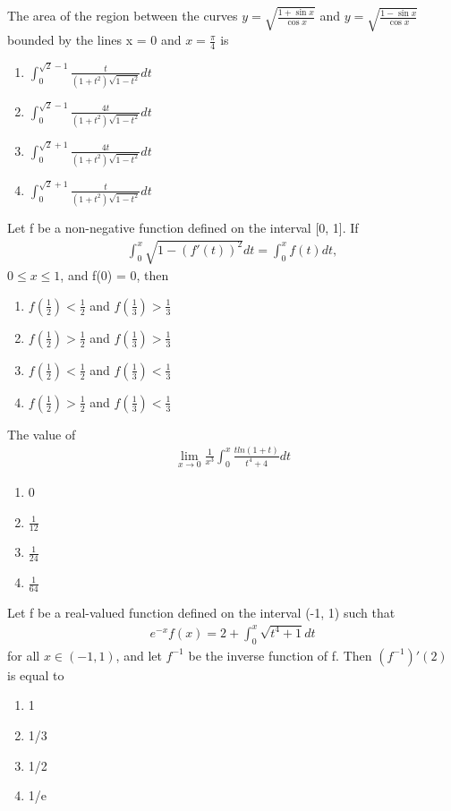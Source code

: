 \item The area of the region between the curves $y = \sqrt{\frac{1 + \sin x}{\cos x}}$ and $y = \sqrt{\frac{1 - \sin x}{\cos x}}$ bounded by the lines x = 0 and $x = \frac{\pi}{4}$ is
\begin{enumerate}
\item $\int_{0}^{\sqrt{2} - 1}\frac{t}{(1 + t^2)\sqrt{1 - t^2}}dt$
\item $\int_{0}^{\sqrt{2} - 1}\frac{4t}{(1 + t^2)\sqrt{1 - t^2}}dt$
\item $\int_{0}^{\sqrt{2} + 1}\frac{4t}{(1 + t^2)\sqrt{1 - t^2}}dt$
\item $\int_{0}^{\sqrt{2} + 1}\frac{t}{(1 + t^2)\sqrt{1 - t^2}}dt$
\end{enumerate}

\item Let f be a non-negative function defined on the interval [0, 1]. If
\begin{align*}
\int_{0}^{x}\sqrt{1 - (f'(t))^2}dt = \int_{0}^{x}f(t)dt,
\end{align*}
$0 \leq x \leq 1$, and f(0) = 0, then
\begin{enumerate}
\item $f(\frac{1}{2}) < \frac{1}{2}$ and $f(\frac{1}{3}) > \frac{1}{3}$
\item $f(\frac{1}{2}) > \frac{1}{2}$ and $f(\frac{1}{3}) > \frac{1}{3}$
\item $f(\frac{1}{2}) < \frac{1}{2}$ and $f(\frac{1}{3}) < \frac{1}{3}$
\item $f(\frac{1}{2}) > \frac{1}{2}$ and $f(\frac{1}{3}) < \frac{1}{3}$
\end{enumerate}

\item The value of 
\begin{align*}
\lim_{x \to 0}\frac{1}{x^3}\int_{0}^{x}\frac{tln(1 + t)}{t^4 + 4}dt
\end{align*}
\begin{enumerate}
\item 0
\item $\frac{1}{12}$
\item $\frac{1}{24}$
\item $\frac{1}{64}$
\end{enumerate}

\item Let f be a real-valued function defined on the interval (-1, 1) such that 
\begin{align*}
e^{-x}f(x) = 2 + \int_{0}^{x}\sqrt{t^4 + 1}dt
\end{align*}
for all $x \in (-1, 1)$, and let $f^{-1}$ be the inverse function of f. Then $(f^{-1})'(2)$ is equal to
\begin{enumerate}
\item 1
\item 1/3
\item 1/2
\item 1/e
\end{enumerate}

